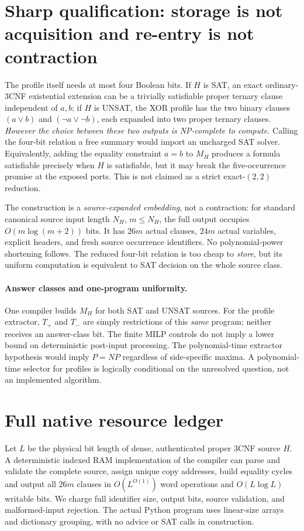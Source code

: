 \documentclass[11pt]{article}
\begin{document}
\section{Sharp qualification: storage is not acquisition and re-entry is not contraction}
The profile itself needs at most four Boolean bits. If $H$ is SAT, an exact ordinary-3CNF existential extension can be a trivially satisfiable proper ternary clause independent of $a,b$; if $H$ is UNSAT, the XOR profile has the two binary clauses $(a\vee b)$ and $(\neg a\vee\neg b)$, each expanded into two proper ternary clauses. \emph{However the choice between these two outputs is NP-complete to compute.} Calling the four-bit relation a free summary would import an uncharged SAT solver. Equivalently, adding the equality constraint $a=b$ to $M_H$ produces a formula satisfiable precisely when $H$ is satisfiable, but it may break the five-occurrence promise at the exposed ports. This is not claimed as a strict exact-$(2,2)$ reduction.

The construction is a \emph{source-expanded embedding}, not a contraction: for standard canonical source input length $N_H$, $m\le N_H$, the full output occupies $O(m\log(m+2))$ bits. It has $26m$ actual clauses, $24m$ actual variables, explicit headers, and fresh source occurrence identifiers. No polynomial-power shortening follows. The reduced four-bit relation is too cheap to \emph{store}, but its uniform computation is equivalent to SAT decision on the whole source class.

\paragraph{Answer classes and one-program uniformity.} One compiler builds $M_H$ for both SAT and UNSAT sources. For the profile extractor, $T_+$ and $T_-$ are simply restrictions of this \emph{same} program; neither receives an answer-class bit. The finite MILP controls do not imply a lower bound on deterministic post-input processing. The polynomial-time extractor hypothesis would imply $P=NP$ regardless of side-specific maxima. A polynomial-time selector for profiles is logically conditional on the unresolved question, not an implemented algorithm.

\section{Full native resource ledger}
Let $L$ be the physical bit length of dense, authenticated proper 3CNF source $H$. A deterministic indexed RAM implementation of the compiler can parse and validate the complete source, assign unique copy addresses, build equality cycles and output all $26m$ clauses in $O(L^{O(1)})$ word operations and $O(L\log L)$ writable bits. We charge full identifier size, output bits, source validation, and malformed-input rejection. The actual Python program uses linear-size arrays and dictionary grouping, with no advice or SAT calls in construction.
\end{document}
